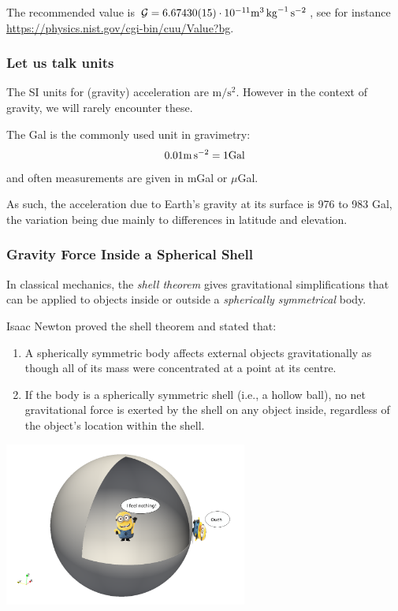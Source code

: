 The recommended value is ${\cal G}=6.67430(15)\cdot 10^{-11} \si{\cubic\meter\per\kg\per\square\second}$, 
see for instance \url{https://physics.nist.gov/cgi-bin/cuu/Value?bg}.

\subsubsection{Let us talk units}
 
The SI units for (gravity) acceleration are $\si{\metre\per\square\second}$.
However in the context of gravity, we will rarely encounter these.

The Gal is the commonly used unit in gravimetry:
\[
0.01 \si{\metre\per\square\second} = 1 {\rm Gal}
\]
and often measurements are given in mGal or $\mu$Gal.

As such, the acceleration due to Earth's gravity 
at its surface is 976 to 983 Gal, the variation being due 
mainly to differences in latitude and elevation. 


\subsubsection{Gravity Force Inside a Spherical Shell}



In classical mechanics, the {\it shell theorem} gives 
gravitational simplifications that can be applied to objects inside or outside a 
{\it spherically symmetrical} body. 

Isaac Newton proved the shell theorem and stated that:
\begin{enumerate}
\item A spherically symmetric body affects external objects gravitationally as though all of its mass were concentrated at a point at its centre.
\item If the body is a spherically symmetric shell (i.e., a hollow ball), no net gravitational force is exerted by the shell on any object inside, regardless of the object's location within the shell.
\end{enumerate}

\begin{center}
\includegraphics[width=8cm]{images/gravity/drawing}
\end{center}

